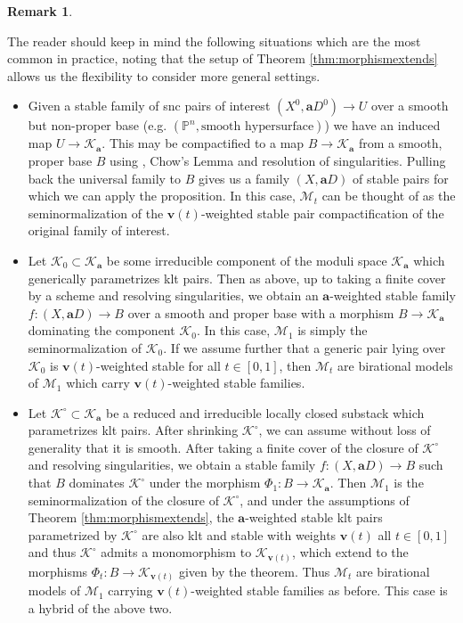 \documentclass[11pt]{amsart}
\theoremstyle{definition}
\newtheorem{remark}[theorem]{Remark}
\theoremstyle{remark}
\newcommand{\sK}{\mathscr{K}}
\newcommand{\sM}{\mathscr{M}}
\newcommand{\bfa}{\mathbf{a}}
\newcommand{\bfv}{\mathbf{v}}
\begin{document}
	\begin{remark}\label{rem:situations}
		
		The reader should keep in mind the following situations which are the most common in practice, noting that the setup of Theorem \ref{thm:morphismextends} allows us the flexibility to consider more general settings. 
		
		\begin{itemize} 
			\item Given a stable family of snc pairs of interest $(X^0, \bfa D^0) \to U$ over a smooth but non-proper base (e.g. $(\mathbb{P}^n, \text{smooth hypersurface})$) we have an induced map $U \to \sK_\bfa$. This may be compactified to a map $B \to \sK_\bfa$ from a smooth, proper base $B$ using \cite[Théorème 16.6]{LMB00}, Chow's Lemma and resolution of singularities. Pulling back the universal family to $B$ gives us a family $(X, \bfa D)$ of stable pairs for which we can apply the proposition. In this case, $\sM_t$ can be thought of as the seminormalization of the $\bfv(t)$-weighted stable pair compactification of the original family of interest. 
			
			\item Let $\sK_0 \subset \sK_{\bfa}$ be some irreducible component of the moduli space $\sK_{\bfa}$ which generically parametrizes klt pairs. Then as above, up to taking a finite cover by a scheme and resolving singularities, we obtain an $\bfa$-weighted stable family $f : (X, \bfa D) \to B$ over a smooth and proper base with a morphism $B \to \sK_\bfa$ dominating the component $\sK_0$. In this case, $\sM_1$ is simply the seminormalization of $\sK_0$. If we assume further that a generic pair lying over $\sK_0$ is $\bfv(t)$-weighted stable for all $t \in [0,1]$, then $\sM_t$ are birational models of $\sM_1$ which carry $\bfv(t)$-weighted stable families. 
			
			\item Let $\sK^\circ \subset \sK_{\bfa}$ be a reduced and irreducible locally closed substack which parametrizes klt pairs. After shrinking $\sK^\circ$, we can assume without loss of generality that it is smooth. After taking a finite cover of the closure of $\sK^\circ$ and resolving singularities, we obtain a stable family $f : (X, \bfa D) \to B$ such that $B$ dominates $\sK^\circ$ under the morphism $\Phi_1 : B \to \sK_{\bfa}$. Then $\sM_1$ is the seminormalization of the closure of $\sK^\circ$, and under the assumptions of Theorem \ref{thm:morphismextends}, the $\bfa$-weighted stable klt pairs parametrized by $\sK^\circ$ are also klt and stable with weights $\bfv(t)$ all $t \in [0,1]$ and thus $\sK^\circ$ admits a monomorphism to $\sK_{\bfv(t)}$, which extend to the morphisms $\Phi_t : B \to \sK_{\bfv(t)}$ given by the theorem. Thus $\sM_t$ are birational models of $\sM_1$ carrying $\bfv(t)$-weighted stable families as before. This case is a hybrid of the above two. 
			
		\end{itemize} 
	\end{remark}
	
\end{document}

